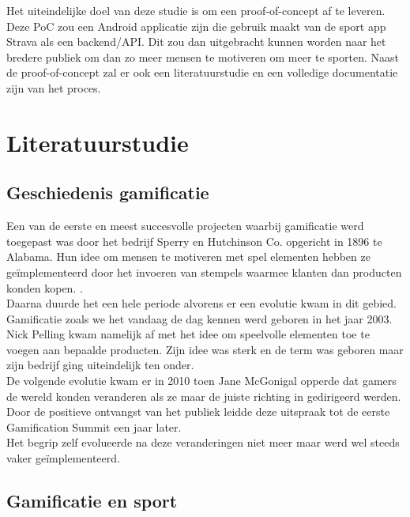Het uiteindelijke doel van deze studie is om een proof-of-concept af te leveren. Deze PoC zou een Android applicatie zijn die gebruik maakt van de sport app Strava als een backend/API. Dit zou dan uitgebracht kunnen worden naar het bredere publiek om dan zo meer mensen te motiveren om meer te sporten. Naast de proof-of-concept zal er ook een literatuurstudie en een volledige documentatie zijn van het proces.


\section{Literatuurstudie}%
\label{sec:state-of-the-art}

\subsection{Geschiedenis gamificatie}

Een van de eerste en meest succesvolle projecten waarbij gamificatie werd toegepast was door het bedrijf Sperry en Hutchinson Co. opgericht in 1896 te Alabama. Hun idee om mensen te motiveren met spel elementen hebben ze geïmplementeerd door het invoeren van stempels waarmee klanten dan producten konden kopen. \autocite{Christians2018}. \\

Daarna duurde het een hele periode alvorens er een evolutie kwam in dit gebied. Gamificatie zoals we het vandaag de dag kennen werd geboren in het jaar 2003. Nick Pelling kwam namelijk af met het idee om speelvolle elementen toe te voegen aan bepaalde producten. Zijn idee was sterk en de term was geboren maar zijn bedrijf ging uiteindelijk ten onder. \autocite{Khaitova2021} \\

De volgende evolutie kwam er in 2010 toen Jane McGonigal opperde dat gamers de wereld konden veranderen als ze maar de juiste richting in gedirigeerd werden. Door de positieve ontvangst van het publiek leidde deze uitspraak tot de eerste Gamification Summit een jaar later. \autocite{Christians2018} \\

Het begrip zelf evolueerde na deze veranderingen niet meer maar werd wel steeds vaker geïmplementeerd. 

\subsection{Gamificatie en sport}

